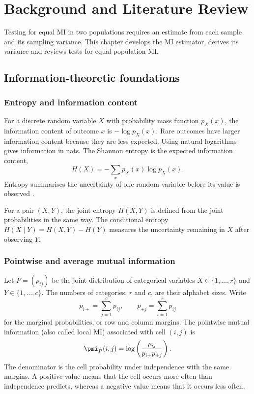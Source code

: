 \chapter{Background and Literature Review}
\label{chap:background}

Testing for equal MI in two populations requires an estimate from each
sample and its sampling variance. This chapter develops the MI estimator,
derives its variance and reviews tests for equal population MI.

\section{Information-theoretic foundations}

\subsection{Entropy and information content}

For a discrete random variable \(X\) with probability mass function
\(p_X(x)\), the information content of outcome \(x\) is
\(-\log p_X(x)\).
Rare outcomes have larger information content because they are less expected.
Using natural logarithms gives information in nats. The Shannon entropy is the
expected information content,
\begin{equation}
  H(X)=-\sum_x p_X(x)\log p_X(x).
  \label{eq:entropy}
\end{equation}
Entropy summarises the uncertainty of one random variable before its value is
observed \citep{shannon1948}.

For a pair \((X,Y)\), the joint entropy \(H(X,Y)\) is defined from the joint
probabilities in the same way. The conditional entropy
\(
H(X\mid Y)=H(X,Y)-H(Y)
\)
measures the uncertainty remaining in \(X\) after observing \(Y\).

\subsection{Pointwise and average mutual information}

Let \(P=(p_{ij})\) be the joint distribution of categorical variables
\(X\in\{1,\ldots,r\}\) and \(Y\in\{1,\ldots,c\}\).
The numbers of categories, \(r\) and \(c\), are their alphabet sizes. Write
\begin{equation}
  p_{i+}=\sum_{j=1}^{c}p_{ij},
  \qquad
  p_{+j}=\sum_{i=1}^{r}p_{ij}
\end{equation}
for the marginal probabilities, or row and column margins. The pointwise
mutual information (also called local MI) associated with cell \((i,j)\) is
\begin{equation}
  \pmi_P(i,j)
  =\log\left(\frac{p_{ij}}{p_{i+}p_{+j}}\right).
  \label{eq:background-pmi}
\end{equation}
The denominator is the cell probability under independence with the same
margins. A positive value means that the cell occurs more often than
independence predicts, whereas a negative value means that it occurs less often.

